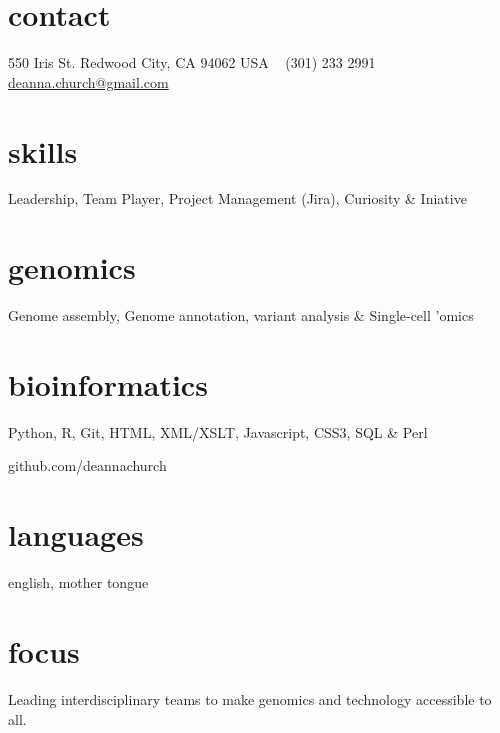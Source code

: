 \documentclass[]{dmc-cv} %
\begin{document}


\begin{aside} %
\section{contact}
550 Iris St.
Redwood City, CA 94062
USA
~
(301) 233 2991
~
\href{mailto:deanna.church@gmail.com}{deanna.church@gmail.com}
\section{skills}
Leadership, Team Player,
Project Management (Jira),
Curiosity \& Iniative
\section{genomics}
Genome assembly,
Genome annotation,
variant analysis \&
Single-cell 'omics
\section{bioinformatics}
Python, R, Git,
HTML, XML/XSLT, Javascript,
CSS3, SQL \& Perl

github.com/deannachurch
\section{languages}
english, mother tongue
\end{aside}

\section{focus}
Leading interdisciplinary teams to make genomics and technology accessible to all.

\end{document}
